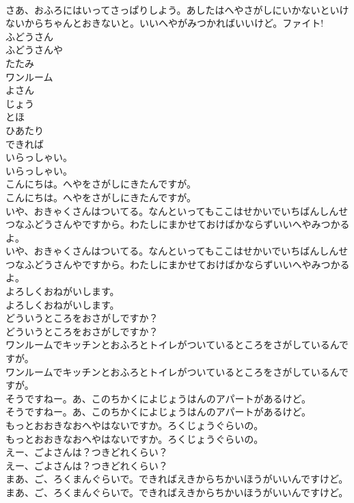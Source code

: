\documentclass[8pt]{extreport}
\begin{document}
\begin{CJK}{UTF8}{min}
\\	さあ、おふろにはいってさっぱりしよう。あしたはへやさがしにいかないといけないからちゃんとおきないと。いいへやがみつかればいいけど。ファイト!
\\	ふどうさん
\\	ふどうさんや
\\	たたみ
\\	ワンルーム
\\	よさん
\\	じょう
\\	とほ
\\	ひあたり
\\	できれば
\\	いらっしゃい。
\\	いらっしゃい。
\\	こんにちは。へやをさがしにきたんですが。
\\	こんにちは。へやをさがしにきたんですが。
\\	いや、おきゃくさんはついてる。なんといってもここはせかいでいちばんしんせつなふどうさんやですから。わたしにまかせておけばかならずいいへやみつかるよ。
\\	いや、おきゃくさんはついてる。なんといってもここはせかいでいちばんしんせつなふどうさんやですから。わたしにまかせておけばかならずいいへやみつかるよ。
\\	よろしくおねがいします。
\\	よろしくおねがいします。
\\	どういうところをおさがしですか？
\\	どういうところをおさがしですか？
\\	ワンルームでキッチンとおふろとトイレがついているところをさがしているんですが。
\\	ワンルームでキッチンとおふろとトイレがついているところをさがしているんですが。
\\	そうですねー。あ、このちかくによじょうはんのアパートがあるけど。
\\	そうですねー。あ、このちかくによじょうはんのアパートがあるけど。
\\	もっとおおきなおへやはないですか。ろくじょうぐらいの。
\\	もっとおおきなおへやはないですか。ろくじょうぐらいの。
\\	えー、ごよさんは？つきどれくらい？
\\	えー、ごよさんは？つきどれくらい？
\\	まあ、ご、ろくまんぐらいで。できればえきからちかいほうがいいんですけど。
\\	まあ、ご、ろくまんぐらいで。できればえきからちかいほうがいいんですけど。

\end{CJK}
\end{document}
